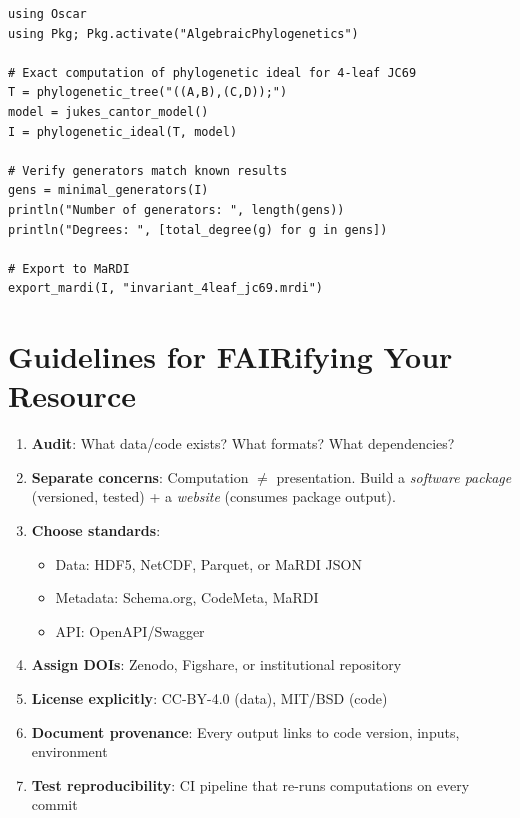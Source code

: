 \begin{lstlisting}[style=julia,caption=Verified computation in OSCAR]
using Oscar
using Pkg; Pkg.activate("AlgebraicPhylogenetics")

# Exact computation of phylogenetic ideal for 4-leaf JC69
T = phylogenetic_tree("((A,B),(C,D));")
model = jukes_cantor_model()
I = phylogenetic_ideal(T, model)

# Verify generators match known results
gens = minimal_generators(I)
println("Number of generators: ", length(gens))
println("Degrees: ", [total_degree(g) for g in gens])

# Export to MaRDI
export_mardi(I, "invariant_4leaf_jc69.mrdi")
\end{lstlisting}

\section{Guidelines for FAIRifying Your Resource} \cite{bacher2026fair}
\label{sec:fair:guidelines}

\begin{enumerate}
    \item \textbf{Audit}: What data/code exists? What formats? What dependencies?
    \item \textbf{Separate concerns}: Computation $\neq$ presentation. Build a \emph{software package} (versioned, tested) + a \emph{website} (consumes package output).
    \item \textbf{Choose standards}: 
    \begin{itemize}
        \item Data: HDF5, NetCDF, Parquet, or MaRDI JSON
        \item Metadata: Schema.org, CodeMeta, MaRDI
        \item API: OpenAPI/Swagger
    \end{itemize}
    \item \textbf{Assign DOIs}: Zenodo, Figshare, or institutional repository
    \item \textbf{License explicitly}: CC-BY-4.0 (data), MIT/BSD (code)
    \item \textbf{Document provenance}: Every output links to code version, inputs, environment
    \item \textbf{Test reproducibility}: CI pipeline that re-runs computations on every commit
\end{enumerate}

